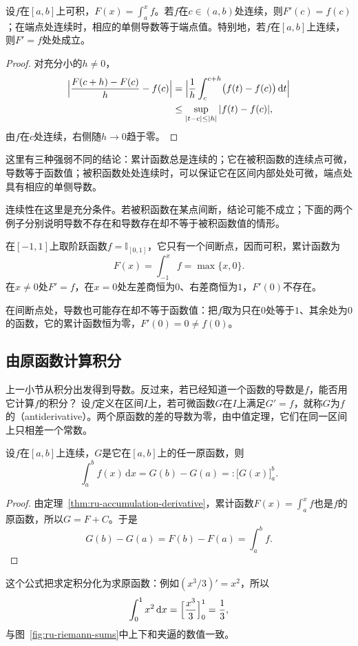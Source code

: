 \begin{theorem}[累计函数的导数]
\label{thm:ru-accumulation-derivative}
设$f$在$[a,b]$上可积，$F(x)=\int_a^xf$。若$f$在$c\in(a,b)$处连续，则$F'(c)=f(c)$；在端点处连续时，相应的单侧导数等于端点值。特别地，若$f$在$[a,b]$上连续，则$F'=f$处处成立。
\end{theorem}
\begin{proof}
对充分小的$h\neq0$，
\[
 \begin{aligned}
 \Bigl|\frac{F(c+h)-F(c)}h-f(c)\Bigr|
 &=\Bigl|\frac1h\int_c^{c+h}\bigl(f(t)-f(c)\bigr)\,\mathrm dt\Bigr|\\
 &\leq\sup_{|t-c|\leq|h|}|f(t)-f(c)|,
 \end{aligned}
\]
由$f$在$c$处连续，右侧随$h\to0$趋于零。
\end{proof}
这里有三种强弱不同的结论：累计函数总是连续的；它在被积函数的连续点可微，导数等于函数值；被积函数处处连续时，可以保证它在区间内部处处可微，端点处具有相应的单侧导数。

连续性在这里是充分条件。若被积函数在某点间断，结论可能不成立；下面的两个例子分别说明导数不存在和导数存在却不等于被积函数值的情形。
\begin{example}[被积函数间断处的累计函数]
\label{ex:ru-accumulation-at-discontinuity}
在$[-1,1]$上取阶跃函数$f=\mathbb I_{[0,1]}$，它只有一个间断点，因而可积，累计函数为
\[
 F(x)=\int_{-1}^xf=\max\{x,0\}.
\]
在$x\neq0$处$F'=f$，在$x=0$处左差商恒为$0$、右差商恒为$1$，$F'(0)$不存在。

在间断点处，导数也可能存在却不等于函数值：把$f$取为只在$0$处等于$1$、其余处为$0$的函数，它的累计函数恒为零，$F'(0)=0\neq f(0)$。
\end{example}

\subsection{由原函数计算积分}
\label{sec:ru-newton-leibniz}

上一小节从积分出发得到导数。反过来，若已经知道一个函数的导数是$f$，能否用它计算$f$的积分？
设$f$定义在区间$I$上，若可微函数$G$在$I$上满足$G'=f$，就称$G$为$f$的（antiderivative）。两个原函数的差的导数为零，由中值定理，它们在同一区间上只相差一个常数。
\begin{theorem}
\label{thm:ru-newton-leibniz}
设$f$在$[a,b]$上连续，$G$是它在$[a,b]$上的任一原函数，则
\begin{equation}
 \int_a^bf(x)\,\mathrm dx=G(b)-G(a)=:\bigl[G(x)\bigr]_a^b.
 \label{eq:ru-newton-leibniz}
\end{equation}
\end{theorem}
\begin{proof}
由定理~\ref{thm:ru-accumulation-derivative}，累计函数$F(x)=\int_a^xf$也是$f$的原函数，所以$G=F+C$。于是
\[
 G(b)-G(a)=F(b)-F(a)=\int_a^bf.
\]
\end{proof}
这个公式把求定积分化为求原函数：例如$(x^3/3)'=x^2$，所以
\[
 \int_0^1x^2\,\mathrm dx=\Bigl[\frac{x^3}3\Bigr]_0^1=\frac13,
\]
与图~\ref{fig:ru-riemann-sums}中上下和夹逼的数值一致。

